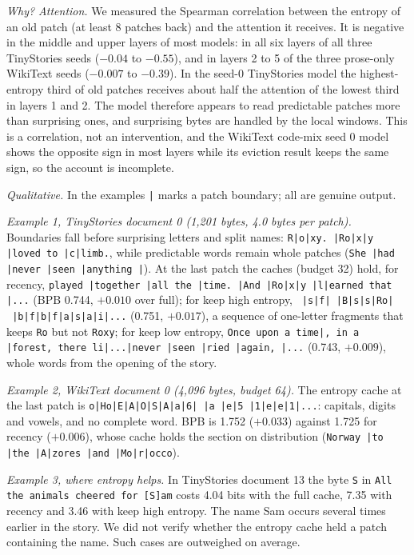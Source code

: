 \textit{Why? Attention.} We measured the Spearman correlation between the entropy of an old patch (at least 8 patches back) and the attention it receives. It is negative in the middle and upper layers of most models: in all six layers of all three TinyStories seeds ($-0.04$ to $-0.55$), and in layers 2 to 5 of the three prose-only WikiText seeds ($-0.007$ to $-0.39$). In the seed-0 TinyStories model the highest-entropy third of old patches receives about half the attention of the lowest third in layers 1 and 2. The model therefore appears to read predictable patches more than surprising ones, and surprising bytes are handled by the local windows. This is a correlation, not an intervention, and the WikiText code-mix seed 0 model shows the opposite sign in most layers while its eviction result keeps the same sign, so the account is incomplete.



\textit{Qualitative.} In the examples \texttt{|} marks a patch boundary; all are genuine output.

\emph{Example 1, TinyStories document 0 (1,201 bytes, 4.0 bytes per patch).} Boundaries fall before surprising letters and split names: \texttt{R|o|xy. |Ro|x|y |loved to |c|limb.}, while predictable words remain whole patches (\texttt{She |had |never |seen |anything |}). At the last patch the caches (budget 32) hold, for recency, \texttt{played |together |all the |time. |And |Ro|x|y |l|earned that |...} (BPB 0.744, $+0.010$ over full); for keep high entropy, \texttt{\ |s|f|\ |B|s|s|Ro|\ |b|f|b|f|a|s|a|i|...} (0.751, $+0.017$), a sequence of one-letter fragments that keeps \texttt{Ro} but not \texttt{Roxy}; for keep low entropy, \texttt{Once upon a time|, in a |forest, there li|...|never |seen |ried |again, |...} (0.743, $+0.009$), whole words from the opening of the story.

\emph{Example 2, WikiText document 0 (4,096 bytes, budget 64).} The entropy cache at the last patch is \texttt{o|Ho|E|A|O|S|A|a|6|\ |a\ |e|5\ |1|e|e|1|...}: capitals, digits and vowels, and no complete word. BPB is 1.752 ($+0.033$) against 1.725 for recency ($+0.006$), whose cache holds the section on distribution (\texttt{Norway |to |the |A|zores |and |Mo|r|occo}).

\emph{Example 3, where entropy helps.} In TinyStories document 13 the byte \texttt{S} in \texttt{All the animals cheered for [S]am} costs 4.04 bits with the full cache, 7.35 with recency and 3.46 with keep high entropy. The name Sam occurs several times earlier in the story. We did not verify whether the entropy cache held a patch containing the name. Such cases are outweighed on average.

